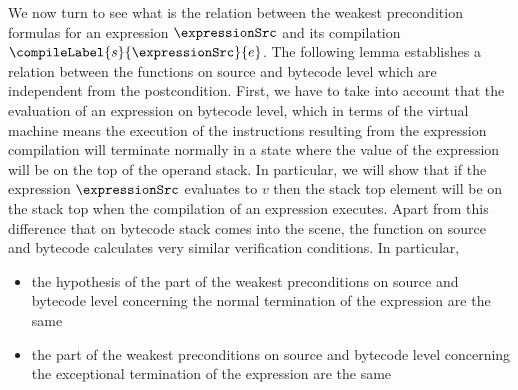 %


We now turn to see what is the relation between  the weakest precondition formulas for  an expression $\expressionSrc$ 
and its compilation $\compileLabel{s}{\expressionSrc}{e}$. 
The following lemma establishes a relation between the \wpName{} functions on source and bytecode level which 
are independent from the postcondition.
 First, we have to take into account that the evaluation 
of an expression on bytecode level, which in terms of the virtual machine means the execution of the instructions
resulting from the expression compilation will terminate normally in a state where the value of the expression will be on the top
of the operand stack. In particular, we will show that if  the expression  $\expressionSrc$ evaluates to $v$ then the stack top element will be on the stack top when 
the compilation of an expression executes.
 Apart from this difference that on bytecode stack comes into the scene, the \wpName{} function on source and bytecode 
calculates very similar verification conditions. In particular, 

\begin{itemize}
  \item the hypothesis of the part of the weakest preconditions on  source and bytecode level
concerning the normal termination of the expression  are the same  
   \item   the part of the weakest preconditions on  source and bytecode level concerning the exceptional termination 
           of the expression are the same  
\end{itemize}



